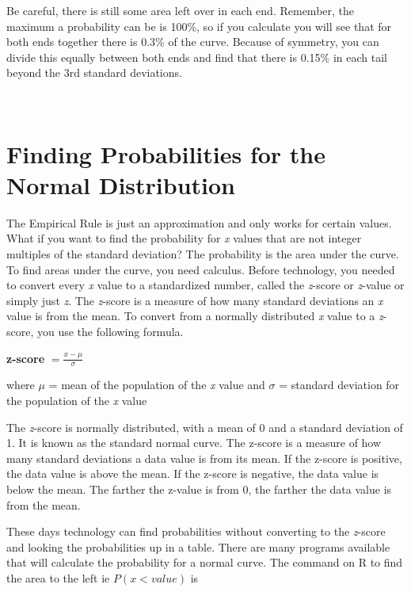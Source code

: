 \documentclass[
]{book}
\begin{document}
Be careful, there is still some area left over in each end. Remember, the maximum a probability can be is 100\%, so if you calculate you will see that for both ends together there is 0.3\% of the curve. Because of
symmetry, you can divide this equally between both ends and find that there is 0.15\% in each tail beyond the 3rd standard deviations.

\textbf{\\
}

\hypertarget{finding-probabilities-for-the-normal-distribution}{%
\section{Finding Probabilities for the Normal Distribution}\label{finding-probabilities-for-the-normal-distribution}}

The Empirical Rule is just an approximation and only works for certain values. What if you want to find the probability for \emph{x} values that are not integer multiples of the standard deviation? The probability is the area under the curve. To find areas under the curve, you need calculus. Before technology, you needed to convert every \emph{x} value to a standardized number, called the \emph{z}-score or \emph{z}-value or simply just \emph{z}. The \emph{z}-score is a measure of how many standard deviations an \emph{x} value is from the mean. To convert from a normally distributed \emph{x} value to a \emph{z}-score, you use the following formula.

\textbf{z-score}
\(=\frac{x-\mu}{\sigma}\)

where \(\mu\) = mean of the population of the \emph{x} value and \(\sigma\) = standard deviation for the population of the \emph{x} value

The \emph{z}-score is normally distributed, with a mean of 0 and a standard deviation of 1. It is known as the standard normal curve. The z-score is a measure of how many standard deviations a data value is from its mean. If the z-score is positive, the data value is above the mean. If the z-score is negative, the data value is below the mean. The farther the z-value is from 0, the farther the data value is from the mean.

These days technology can find probabilities without converting to the \emph{z}-score and looking the probabilities up in a table. There are many programs available that will calculate the probability for a normal curve. The command on R to find the area to the left ie \(P(x<value)\) is
\end{document}
